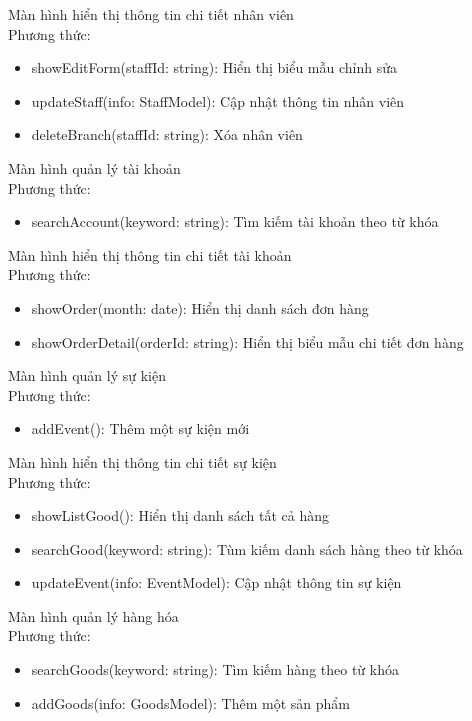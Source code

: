 Màn hình hiển thị thông tin chi tiết nhân viên\\
Phương thức:
\begin{itemize}
	\item showEditForm(staffId: string): Hiển thị biểu mẫu chỉnh sửa
	\item updateStaff(info: StaffModel): Cập nhật thông tin nhân viên
	\item deleteBranch(staffId: string): Xóa nhân viên
\end{itemize}

Màn hình quản lý tài khoản\\
Phương thức:
\begin{itemize}
	\item searchAccount(keyword: string): Tìm kiếm tài khoản theo từ khóa
\end{itemize}


Màn hình hiển thị thông tin chi tiết tài khoản\\
Phương thức:
\begin{itemize}
	\item showOrder(month: date): Hiển thị danh sách đơn hàng
	\item showOrderDetail(orderId: string): Hiển thị biểu mẫu chi tiết đơn hàng
\end{itemize}

Màn hình quản lý sự kiện\\
Phương thức:
\begin{itemize}
	\item addEvent(): Thêm một sự kiện mới
\end{itemize}

Màn hình hiển thị thông tin chi tiết sự kiện\\
Phương thức:
\begin{itemize}
	\item showListGood(): Hiển thị danh sách tất cả hàng
	\item searchGood(keyword: string): Tùm kiếm danh sách hàng theo từ khóa
	\item updateEvent(info: EventModel): Cập nhật thông tin sự kiện
\end{itemize}

Màn hình quản lý hàng hóa\\
Phương thức:
\begin{itemize}
	\item searchGoods(keyword: string): Tìm kiếm hàng theo từ khóa
	\item addGoods(info: GoodsModel): Thêm một sản phẩm
\end{itemize}

